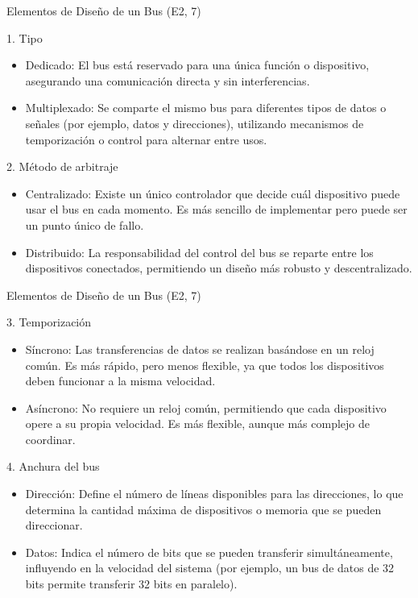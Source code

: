 \documentclass[presentation]{beamer}
\begin{document}
\begin{frame}[label={sec:orgeaf39b9}]{Elementos de Diseño de un Bus (E2, 7)}
\begin{block}{1. Tipo}
\begin{itemize}
\item \alert{Dedicado}: El bus está reservado para una única función o dispositivo, asegurando una comunicación directa y sin interferencias.
\item \alert{Multiplexado}: Se comparte el mismo bus para diferentes tipos de datos o señales (por ejemplo, datos y direcciones), utilizando mecanismos de temporización o control para alternar entre usos.
\end{itemize}
\end{block}



\begin{block}{2. Método de arbitraje}
\begin{itemize}
\item \alert{Centralizado}: Existe un único controlador que decide cuál dispositivo puede usar el bus en cada momento. Es más sencillo de implementar pero puede ser un punto único de fallo.
\item \alert{Distribuido}: La responsabilidad del control del bus se reparte entre los dispositivos conectados, permitiendo un diseño más robusto y descentralizado.
\end{itemize}
\end{block}
\end{frame}
\begin{frame}[label={sec:orgdf46091}]{Elementos de Diseño de un Bus (E2, 7)}
\begin{block}{3. Temporización}
\begin{itemize}
\item \alert{Síncrono}: Las transferencias de datos se realizan basándose en un reloj común. Es más rápido, pero menos flexible, ya que todos los dispositivos deben funcionar a la misma velocidad.
\item \alert{Asíncrono}: No requiere un reloj común, permitiendo que cada dispositivo opere a su propia velocidad. Es más flexible, aunque más complejo de coordinar.
\end{itemize}
\end{block}



\begin{block}{4. Anchura del bus}
\begin{itemize}
\item \alert{Dirección}: Define el número de líneas disponibles para las direcciones, lo que determina la cantidad máxima de dispositivos o memoria que se pueden direccionar.
\item \alert{Datos}: Indica el número de bits que se pueden transferir simultáneamente, influyendo en la velocidad del sistema (por ejemplo, un bus de datos de 32 bits permite transferir 32 bits en paralelo).
\end{itemize}
\end{block}
\end{frame}
\end{document}
